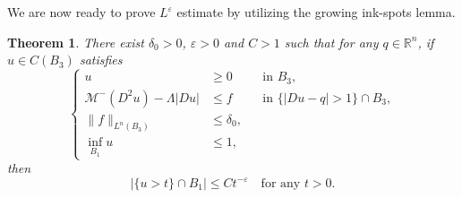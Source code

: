 \documentclass[11pt]{amsart}
\theoremstyle{plain}
\newtheorem{theorem}{Theorem}[section]
\theoremstyle{definition}
\numberwithin{equation}{section}
\begin{document}
We are now ready to prove $L^\varepsilon$ estimate by utilizing the growing ink-spots lemma.
\begin{theorem}
    There exist $\delta_0>0$, $\varepsilon>0$ and $C>1$ such that for any $q \in \mathbb{R}^n$, if $u \in C(B_3)$ satisfies
    \begin{equation*}
    \left\{
        \begin{aligned}
            u &\geq 0 &&\text{in } B_3,\\
            \mathcal{M}^-(D^2u)-\Lambda|Du| &\leq f &&\text{in } \{|Du-q| > 1\}\cap B_3,\\
            \|f\|_{L^n(B_3)} &\leq \delta_0, \\
            \inf_{B_1} u &\leq 1,
        \end{aligned}
        \right.
    \end{equation*}
    then
    \begin{equation*}
        |\{u>t\} \cap B_1| \leq Ct^{-\varepsilon} \quad \text{for any } t>0.
    \end{equation*}
\end{theorem}
\end{document}
